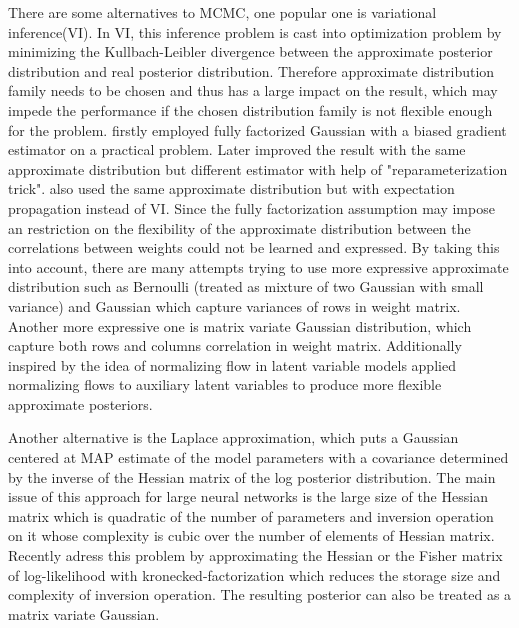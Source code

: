 There are some alternatives to MCMC, one popular one is variational inference(VI)\cite{hinton1993keeping}. In VI, this inference problem is cast into optimization problem by minimizing the Kullbach-Leibler divergence between the approximate posterior distribution and real posterior distribution. Therefore approximate distribution family needs to be chosen and thus has a large impact on the result, which may impede the performance if the chosen distribution family is not flexible enough for the problem. \cite{graves2011practical} firstly employed fully factorized Gaussian with a biased gradient estimator on a practical problem. Later \cite{blundell2015weight} improved the result with the same approximate distribution but different estimator with help of "reparameterization trick"\cite{kingma2013auto}. \citealp{hernandez2015probabilistic} also used the same approximate distribution but with expectation propagation\cite{minka2001expectation} instead of VI.
Since the fully factorization assumption may impose an restriction on the flexibility of the approximate distribution between the correlations between weights could not be learned and expressed. By taking this into account, there are many attempts trying to use more expressive approximate distribution such as Bernoulli (treated as mixture of two Gaussian with small variance)\cite{gal2016dropout} and Gaussian \cite{kingma2015variational} which capture variances of rows in weight matrix. Another more expressive one is matrix variate Gaussian distribution\cite{louizos2016structured}\cite{sun2017learning}\cite{zhang2017noisy}, which capture both rows and columns correlation in weight matrix. Additionally inspired by the idea of normalizing flow in latent variable models \cite{louizos2017multiplicative}applied normalizing flows to auxiliary latent variables to produce more flexible approximate posteriors. 


Another alternative is the Laplace approximation\cite{mackay1992practical}, which puts a Gaussian centered at MAP estimate of the model parameters with a covariance determined by the inverse of the Hessian matrix of the log posterior distribution. The main issue of this approach for large neural networks is the large size of the Hessian matrix which is quadratic of the number of parameters and inversion operation on it whose complexity is cubic over the number of elements of Hessian matrix. Recently \cite{ritter2018scalable} adress this problem by approximating the Hessian or the Fisher matrix of log-likelihood with kronecked-factorization which reduces the storage size and complexity of inversion operation. The resulting posterior can also be treated as a matrix variate Gaussian.  

